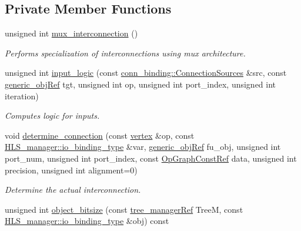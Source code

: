 \subsection*{Private Member Functions}
\begin{DoxyCompactItemize}
\item 
unsigned int \hyperlink{classmux__connection__binding_adfcb7df795ba15e433753c6682e44daa}{mux\+\_\+interconnection} ()
\begin{DoxyCompactList}\small\item\em Performs specialization of interconnections using mux architecture. \end{DoxyCompactList}\item 
unsigned int \hyperlink{classmux__connection__binding_a0adc59417dbca6bec2932be7341490a0}{input\+\_\+logic} (const \hyperlink{classconn__binding_aa5406c3bf4cee893234c2b0847471f56}{conn\+\_\+binding\+::\+Connection\+Sources} \&src, const \hyperlink{generic__obj_8hpp_acb533b2ef8e0fe72e09a04d20904ca81}{generic\+\_\+obj\+Ref} tgt, unsigned int op, unsigned int port\+\_\+index, unsigned int iteration)
\begin{DoxyCompactList}\small\item\em Computes logic for inputs. \end{DoxyCompactList}\item 
void \hyperlink{classmux__connection__binding_ad6e5804e02d1a7c926ecdb1ae458a76f}{determine\+\_\+connection} (const \hyperlink{graph_8hpp_abefdcf0544e601805af44eca032cca14}{vertex} \&op, const \hyperlink{classHLS__manager_a972627cc658afa992590b9d2bf1a1e87}{H\+L\+S\+\_\+manager\+::io\+\_\+binding\+\_\+type} \&var, \hyperlink{generic__obj_8hpp_acb533b2ef8e0fe72e09a04d20904ca81}{generic\+\_\+obj\+Ref} fu\+\_\+obj, unsigned int port\+\_\+num, unsigned int port\+\_\+index, const \hyperlink{op__graph_8hpp_a9a0b240622c47584bee6951a6f5de746}{Op\+Graph\+Const\+Ref} data, unsigned int precision, unsigned int alignment=0)
\begin{DoxyCompactList}\small\item\em Determine the actual interconnection. \end{DoxyCompactList}\item 
unsigned int \hyperlink{classmux__connection__binding_a5a1ab44883c4e500c1a23724fbff9364}{object\+\_\+bitsize} (const \hyperlink{tree__manager_8hpp_a96ff150c071ce11a9a7a1e40590f205e}{tree\+\_\+manager\+Ref} TreeM, const \hyperlink{classHLS__manager_a972627cc658afa992590b9d2bf1a1e87}{H\+L\+S\+\_\+manager\+::io\+\_\+binding\+\_\+type} \&obj) const

\end{DoxyCompactItemize}
